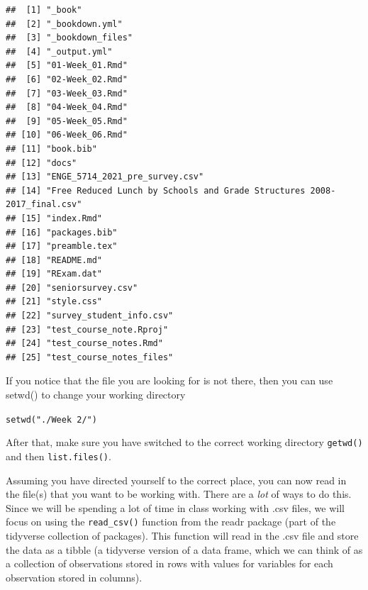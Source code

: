 \documentclass[
]{book}
\begin{document}
\begin{verbatim}
##  [1] "_book"                                                                 
##  [2] "_bookdown.yml"                                                         
##  [3] "_bookdown_files"                                                       
##  [4] "_output.yml"                                                           
##  [5] "01-Week_01.Rmd"                                                        
##  [6] "02-Week_02.Rmd"                                                        
##  [7] "03-Week_03.Rmd"                                                        
##  [8] "04-Week_04.Rmd"                                                        
##  [9] "05-Week_05.Rmd"                                                        
## [10] "06-Week_06.Rmd"                                                        
## [11] "book.bib"                                                              
## [12] "docs"                                                                  
## [13] "ENGE_5714_2021_pre_survey.csv"                                         
## [14] "Free Reduced Lunch by Schools and Grade Structures 2008-2017_final.csv"
## [15] "index.Rmd"                                                             
## [16] "packages.bib"                                                          
## [17] "preamble.tex"                                                          
## [18] "README.md"                                                             
## [19] "RExam.dat"                                                             
## [20] "seniorsurvey.csv"                                                      
## [21] "style.css"                                                             
## [22] "survey_student_info.csv"                                               
## [23] "test_course_note.Rproj"                                                
## [24] "test_course_notes.Rmd"                                                 
## [25] "test_course_notes_files"
\end{verbatim}

If you notice that the file you are looking for is not there, then you can use setwd() to change your working directory

\texttt{setwd("./Week\ 2/")}

After that, make sure you have switched to the correct working directory
\texttt{getwd()} and then \texttt{list.files()}.

Assuming you have directed yourself to the correct place, you can now read in the file(s) that you want to be working with. There are a \emph{lot} of ways to do this. Since we will be spending a lot of time in class working with .csv files, we will focus on using the \texttt{read\_csv()} function from the readr package (part of the tidyverse collection of packages). This function will read in the .csv file and store the data as a tibble (a tidyverse version of a data frame, which we can think of as a collection of observations stored in rows with values for variables for each observation stored in columns).
\end{document}
